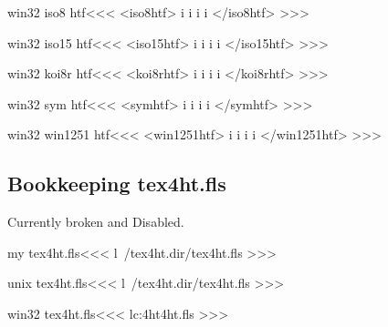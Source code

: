 \documentclass{article}
\begin{document}
\<win32 iso8 htf\><<<
<iso8htf>
i%
i%
i%
i%
</iso8htf>
>>>


\<win32 iso15 htf\><<<
<iso15htf>
i%
i%
i%
i%
</iso15htf>
>>>



\<win32 koi8r htf\><<<
<koi8rhtf>
i%
i%
i%
i%
</koi8rhtf>
>>>


\<win32 sym htf\><<<                                                     %
<symhtf>
i%
i%
i%
i%
</symhtf>
>>>



\<win32 win1251 htf\><<<                                                     %
<win1251htf>
i%
i%
i%
i%
</win1251htf>
>>>





\subsection{Bookkeeping tex4ht.fls}

Currently broken and Disabled.


\<my tex4ht.fls\><<<
l~/tex4ht.dir/tex4ht.fls
>>>




\<unix tex4ht.fls\><<<
 l~/tex4ht.dir/tex4ht.fls
>>>



\<win32 tex4ht.fls\><<<
lc:\tex4ht\tex4ht.fls
>>>
\end{document}
